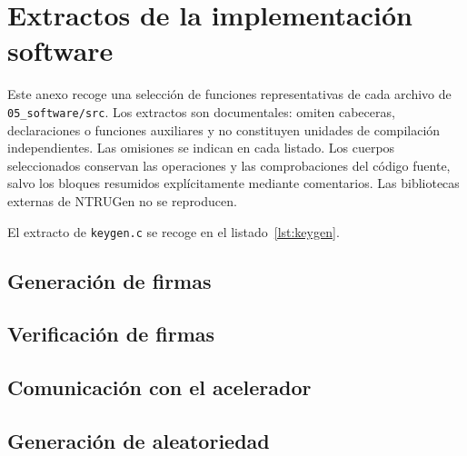 \chapter{Extractos de la implementación software}
\label{anexo:extractos-software}
\begingroup
\singlespacing

Este anexo recoge una selección de funciones representativas de cada
archivo de \texttt{05\_software/src}. Los extractos son documentales:
omiten cabeceras, declaraciones o funciones auxiliares y no constituyen
unidades de compilación independientes. Las omisiones se indican en cada
listado. Los cuerpos seleccionados conservan las operaciones y las
comprobaciones del código fuente, salvo los bloques resumidos explícitamente
mediante comentarios. Las bibliotecas externas de NTRUGen no se reproducen.

El extracto de \texttt{keygen.c} se recoge en el listado~\ref{lst:keygen}.

\section{Generación de firmas}


\clearpage
\section{Verificación de firmas}


\clearpage
\section{Comunicación con el acelerador}


\clearpage
\section{Generación de aleatoriedad}



